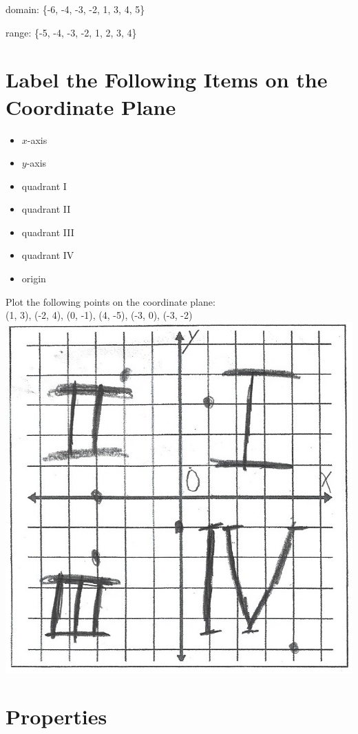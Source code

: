 \documentclass[11pt]{article} %
\begin{document}
domain: \{-6, -4, -3, -2, 1, 3, 4, 5\}

range: \{-5, -4, -3, -2, 1, 2, 3, 4\}

\section{Label the Following Items on the Coordinate Plane}

\begin{itemize}
\item $x$-axis
\item $y$-axis
\item quadrant I
\item quadrant II
\item quadrant III
\item quadrant IV
\item origin
\end{itemize}
Plot the following points on the coordinate plane: \\
(1, 3), (-2, 4), (0, -1), (4, -5), (-3, 0), (-3, -2) \\

\includegraphics{graph_2}

\section{Properties}
\end{document}
